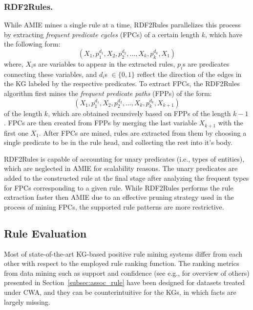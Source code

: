 \subsubsection{RDF2Rules.}
While AMIE mines a single rule at a time, RDF2Rules \cite{rdf2rules} parallelizes this process by extracting \emph{frequent predicate cycles} (FPCs) of %
a certain length $k$, which have the following form:
\[ (X_1, p_1^{d_1}, X_2, p_2^{d_2},\dotsc, X_k, p_k^{d_k}, X_1)\]
where, $X_i$s are variables to appear in the extracted rules, $p_i$s are predicates connecting these variables, and $d_i$s $\in \{0,1\}$ reflect the direction of the edges in the KG labeled by the respective predicates. To extract FPCs, the RDF2Rules algorithm first mines the \emph{frequent predicate paths} (FPPs) of the form:
\[(X_1, p_1^{d_1}, X_2, p_2^{d_2}, ...,X_k, p_k^{d_k}, X_{k+1})\]
of the length $k$, which are obtained recursively based on FPPs of the length $k-1$. 
FPCs are then created from FPPs by merging the last variable $X_{k+1}$ with the first one $X_1$.
After FPCs are mined, rules are extracted from them by choosing a single %
predicate to be in the rule head, and collecting the rest into it's body. 

RDF2Rules is capable of accounting for unary predicates (i.e., types of entities), which are neglected in AMIE for scalability reasons. %
The unary predicates are added to the constructed rule at the final stage after analyzing the 
frequent types for FPCs corresponding to a given rule.
While RDF2Rules performs the rule extraction faster then AMIE due to an effective pruning strategy
used in the process of mining FPCs, the supported rule patterns are more restrictive. 

\subsection{Rule Evaluation}
Most of state-of-the-art KG-based positive rule mining systems %
differ from each other with respect to the employed %
rule ranking function. %
The ranking metrics from data mining such as support and confidence (see e.g., \cite{metrics-summary} for overview of others) presented in Section~\ref{subsec:assoc_rule} have been designed for datasets treated under CWA, and they can be counterintuitive for the KGs, in which facts are largely missing.

